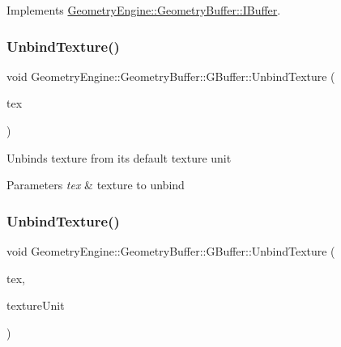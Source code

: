 Implements \mbox{\hyperlink{class_geometry_engine_1_1_geometry_buffer_1_1_i_buffer_a1136bf19a08f111e08648e66a8518b09}{Geometry\+Engine\+::\+Geometry\+Buffer\+::\+I\+Buffer}}.

\mbox{\label{class_geometry_engine_1_1_geometry_buffer_1_1_g_buffer_a15ffb63e72295abb6a10b2481fb878e4}} 
\subsubsection{\texorpdfstring{UnbindTexture()}{UnbindTexture()}\hspace{0.1cm}{\footnotesize\ttfamily [3/4]}}
{\footnotesize\ttfamily void Geometry\+Engine\+::\+Geometry\+Buffer\+::\+G\+Buffer\+::\+Unbind\+Texture (\begin{DoxyParamCaption}\item[{\mbox{\hyperlink{class_geometry_engine_1_1_geometry_buffer_1_1_g_buffer_a718dceafcac1915f7de061108597e1cc}{G\+B\+U\+F\+F\+E\+R\+\_\+\+T\+E\+X\+T\+U\+R\+E\+\_\+\+T\+Y\+PE}}}]{tex }\end{DoxyParamCaption})}

Unbinds texture from its default texture unit 
\begin{DoxyParams}{Parameters}
{\em tex} & texture to unbind \\
\hline
\end{DoxyParams}
\mbox{\label{class_geometry_engine_1_1_geometry_buffer_1_1_g_buffer_a0bbb50c4eabcee8677a3da316042c44e}} 
\subsubsection{\texorpdfstring{UnbindTexture()}{UnbindTexture()}\hspace{0.1cm}{\footnotesize\ttfamily [4/4]}}
{\footnotesize\ttfamily void Geometry\+Engine\+::\+Geometry\+Buffer\+::\+G\+Buffer\+::\+Unbind\+Texture (\begin{DoxyParamCaption}\item[{\mbox{\hyperlink{class_geometry_engine_1_1_geometry_buffer_1_1_g_buffer_a718dceafcac1915f7de061108597e1cc}{G\+B\+U\+F\+F\+E\+R\+\_\+\+T\+E\+X\+T\+U\+R\+E\+\_\+\+T\+Y\+PE}}}]{tex,  }\item[{unsigned int}]{texture\+Unit }\end{DoxyParamCaption})}

